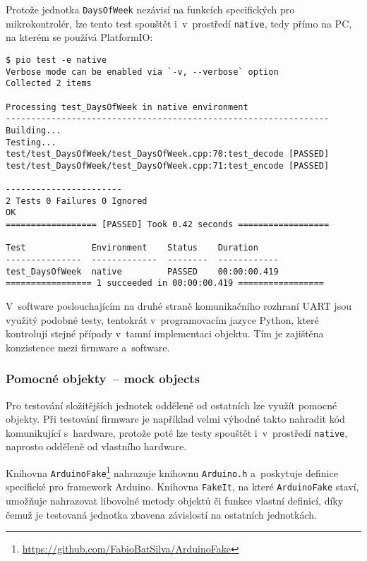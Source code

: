 Protože jednotka \texttt{DaysOfWeek} nezávisí na funkcích specifických pro
mikrokontrolér, lze tento test spouštět i~v~prostředí \texttt{native}, tedy
přímo na PC, na kterém se používá PlatformIO:
\begin{lstlisting}[style=terminal,columns=fixed]
$ pio test -e native
Verbose mode can be enabled via `-v, --verbose` option
Collected 2 items

Processing test_DaysOfWeek in native environment
----------------------------------------------------------------
Building...
Testing...
test/test_DaysOfWeek/test_DaysOfWeek.cpp:70:test_decode	[PASSED]
test/test_DaysOfWeek/test_DaysOfWeek.cpp:71:test_encode	[PASSED]

-----------------------
2 Tests 0 Failures 0 Ignored
OK
================== [PASSED] Took 0.42 seconds ==================

Test             Environment    Status    Duration
---------------  -------------  --------  ------------
test_DaysOfWeek  native         PASSED    00:00:00.419
================= 1 succeeded in 00:00:00.419 =================
\end{lstlisting}

V~software poslouchajícím na druhé straně komunikačního rozhraní UART jsou
využitý podobné testy, tentokrát v~programovacím jazyce Python, které
kontrolují stejné případy v~tamní implementaci objektu. Tím je zajištěna
konzistence mezi firmware a~software.


\subsubsection{Pomocné objekty~-- mock objects}
Pro testování složitějších jednotek odděleně od ostatních lze využít pomocné
objekty. Při testování firmware je například velmi výhodné takto nahradit kód
komunikující s~hardware, protože poté lze testy spouštět i~v~prostředí
\texttt{native}, naprosto odděleně od vlastního hardware.

Knihovna
\texttt{ArduinoFake}\footnote{\url{https://github.com/FabioBatSilva/ArduinoFake}}
nahrazuje knihovnu \texttt{Arduino.h} a~poskytuje definice specifické pro
framework Arduino. Knihovna \texttt{FakeIt}, na které \texttt{ArduinoFake}
staví, umožňuje nahrazovat libovolné metody objektů či funkce vlastní definicí,
díky čemuž je testovaná jednotka zbavena závislostí na ostatních jednotkách.

